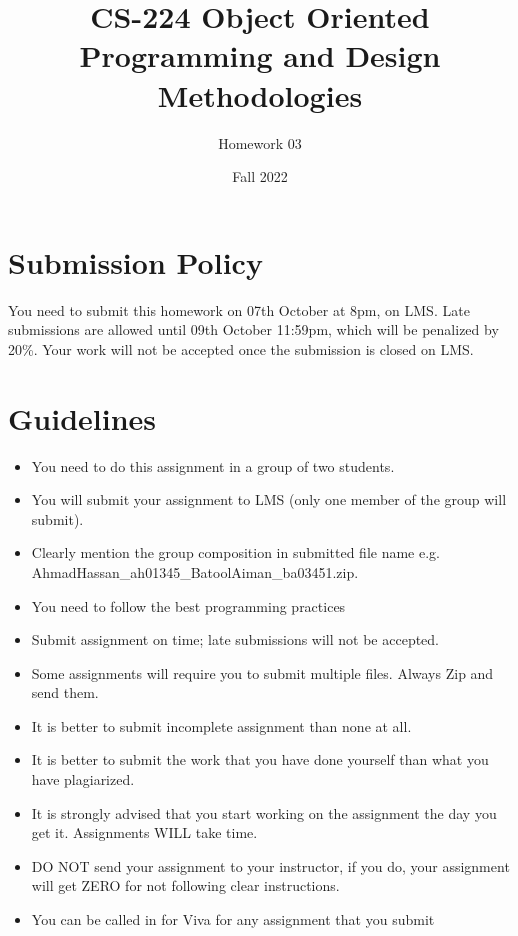 \documentclass[a4paper,12pt]{article}
\begin{document}
	
	\title{CS-224 Object Oriented Programming and Design Methodologies }
	\author{Homework 03}
	\date{Fall 2022}
	\maketitle
	
	
	\section{Submission Policy}
	You need to submit this homework on  {\color{blue}07th October at 8pm}, on LMS. Late submissions are allowed until {\color{red} 09th October 11:59pm}, which will be penalized by 20\%. Your work will not be accepted once the submission is closed on LMS.
	

	\section{Guidelines}
	\begin{itemize}
		\item You need to do this assignment in a group of two students.
		\item You will submit your assignment to LMS (only one member of the group will submit).
		\item Clearly mention the group composition in submitted file name e.g. AhmadHassan\_ah01345\_BatoolAiman\_ba03451.zip. 
		\item You need to follow the best programming practices 
		\item Submit assignment on time; late submissions will not be accepted.
		\item Some assignments will require you to submit multiple files. Always Zip and send them.
		\item It is better to submit incomplete assignment than none at all.
		\item It is better to submit the work that you have done yourself than what you have plagiarized.
		\item It is strongly advised that you start working on the assignment the day you get it. Assignments WILL take time.
		\item DO NOT send your assignment to your instructor, if you do, your assignment will get ZERO for not following clear instructions.
		\item You can be called in for Viva for any assignment that you submit
	\end{itemize}
	
\end{document}
